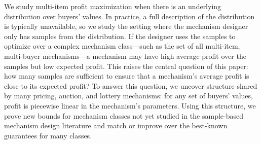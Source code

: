 We study multi-item profit maximization when there is an underlying distribution over buyers' values. In practice, a full description of the distribution is typically unavailable, so we study the setting where the mechanism designer only has samples from the distribution. If the designer uses the samples to optimize over a complex mechanism class---such as the set of all multi-item, multi-buyer mechanisms---a mechanism may have high average profit over the samples but low expected profit. This raises the central question of this paper: how many samples are sufficient to ensure that a mechanism's average profit is close to its expected profit? To answer this question, we uncover structure shared by many pricing, auction, and lottery mechanisms: for any set of buyers' values, profit is piecewise linear in the mechanism's parameters. Using this structure, we prove new bounds for mechanism classes not yet studied in the sample-based mechanism design literature and match or improve over the best-known guarantees for many classes.